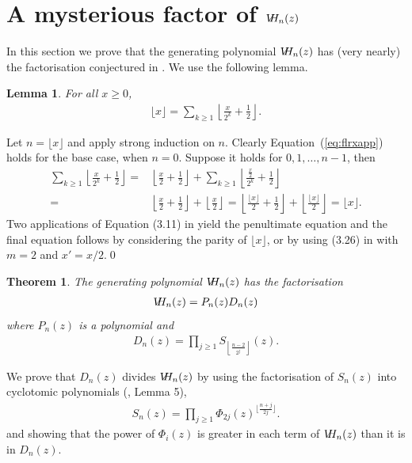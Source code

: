 \documentclass[12pt]{amsart}
\newtheorem{theorem}{Theorem}
\newtheorem{lemma}{Lemma}
\newcommand{\eref}[1]{Equation~(\ref{eq:#1})}
\newcommand\flr[2]{\left\lfloor \frac{#1}{#2} \right\rfloor}
\newcommand{\vh}{V\hspace{-5pt}H}
\newcommand{\round}[2]{\left\lfloor
    \frac{#1}{#2} + \frac{1}{2} \right\rfloor}
\begin{document}
\section{A mysterious factor of $\vh_n(z)$}
\label{sec:pn}

In this section we prove that the generating polynomial $\vh_n(z)$ has
(very nearly) the factorisation conjectured in
\cite{EricksonRuskeySchurch2011}.  We use the following lemma.

\begin{lemma}
  \label{lem:flrxapp} For all $x\ge 0$,
  \begin{align}
  \label{eq:flrxapp}
    \lfloor x \rfloor = \sum_{k\ge 1} \left\lfloor \frac{x}{2^k}+\frac{1}{2} \right\rfloor.
  \end{align}
\end{lemma}
\proof Let $n = \lfloor x \rfloor$ and apply strong induction on $n$.
Clearly \eref{flrxapp} holds for the base case, when $n=0$.  Suppose
it holds for $0,1,\ldots, n-1$, then
\begin{align*}
  \sum_{k\ge 1} \round{x}{2^k} =& \round{x}{2} + \sum_{k\ge 1}
  \round{\frac{x}{2}}{2^k} \\
  =& \round{x}{2} + \flr{x}{2} = \round{\lfloor x \rfloor}{2} +
  \flr{\lfloor x \rfloor}{2} = \lfloor x \rfloor.
\end{align*}
Two applications of Equation (3.11) in \cite{GrahamKnuthPatashnik1994}
yield the penultimate equation and the final equation follows by
considering the parity of $\lfloor x \rfloor$, or by using (3.26) in
\cite{GrahamKnuthPatashnik1994} with $m=2$ and $x'=x/2$.\qed


\begin{theorem}
  \label{thm:cyclotomic}
  The generating polynomial $\vh_n(z)$ has the factorisation
  \begin{align*}
    \vh_n(z) = P_n(z)D_n(z)
  \end{align*}
  where $P_n(z)$ is a polynomial and
  \begin{align}
    \label{eq:dn}
  D_n(z) = \prod_{j\ge 1} S_{\left\lfloor \frac{n-2}{2^j}
      \right\rfloor}(z).
  \end{align}
\end{theorem}
\proof %
We prove that $D_n(z)$ divides $\vh_n(z)$ by using the
factorisation of $S_n(z)$ into cyclotomic polynomials
(\cite{EricksonRuskeySchurch2011}, Lemma 5),
\begin{align}
  \label{eq:snphi}
  S_n(z) = \prod_{j\ge 1} \Phi_{2j} (z)^{\lfloor \frac{n+j}{2j}
    \rfloor}.
\end{align}
and showing that the power of $\Phi_i(z)$ is greater in each term of
$\vh_n(z)$ than it is in $D_n(z)$.
\end{document}

